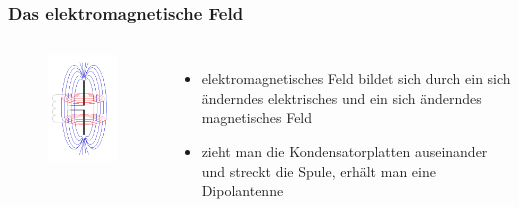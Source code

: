 \begin{frame}
  \frametitle{Das elektromagnetische Feld}
  \begin{columns}
    \begin{center}
      \begin{figure}
        \includegraphics[width=1\textwidth,height=.7\textheight,keepaspectratio]{e08/Dipolentstehung-11.png}
      \end{figure}
    \end{center}
    \begin{itemize}
      \item elektromagnetisches Feld bildet sich durch ein sich änderndes elektrisches und ein sich änderndes magnetisches Feld
      \item zieht man die Kondensatorplatten auseinander und streckt die Spule, erhält man eine Dipolantenne
    \end{itemize}
  \end{columns}
\end{frame}

